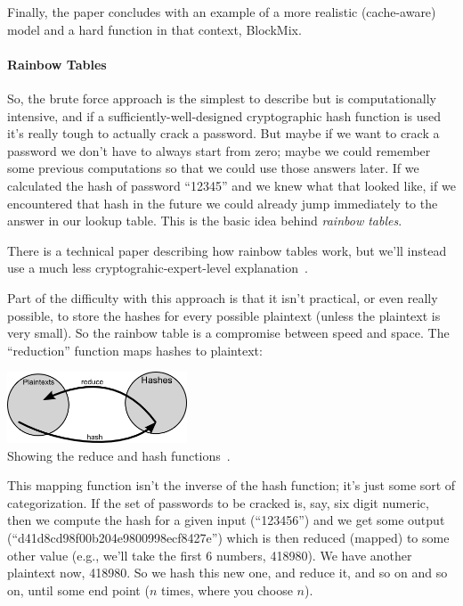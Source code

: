 Finally, the paper concludes with an example of a more realistic
(cache-aware) model and a hard function in that context, BlockMix.

\paragraph{Rainbow Tables} So, the brute force approach is the simplest to describe but is computationally intensive, and if a sufficiently-well-designed cryptographic hash function is used it's really tough to actually crack a password. But maybe if we want to crack a password we don't have to always start from zero; maybe we could remember some previous computations so that we could use those answers later. If we calculated the hash of password ``12345'' and we knew what that looked like, if we encountered that hash in the future we could already jump immediately to the answer in our lookup table. This is the basic idea behind \textit{rainbow tables}.

There is a technical paper describing how rainbow tables work, but we'll instead use a much less cryptograhic-expert-level explanation~\cite{rainbowtables}. 

Part of the difficulty with this approach is that it isn't practical, or even really possible, to store the hashes for every possible plaintext (unless the plaintext is very small). So the rainbow table is a compromise between speed and space. The ``reduction'' function maps hashes to plaintext:

\begin{center}
	\includegraphics[width=0.4\textwidth]{images/rainbow-tables-reduce.png}\\
	Showing the reduce and hash functions~\cite{rainbowtables}.
\end{center}

This mapping function isn't the inverse of the hash function; it's just some sort of categorization. If the set of passwords to be cracked is, say, six digit numeric, then we compute the hash for a given input (``123456'') and we get some output (``d41d8cd98f00b204e9800998ecf8427e'') which is then reduced (mapped) to some other value (e.g., we'll take the first 6 numbers, 418980). We have another plaintext now, 418980. So we hash this new one, and reduce it, and so on and so on, until some end point ($n$ times, where you choose $n$). 

